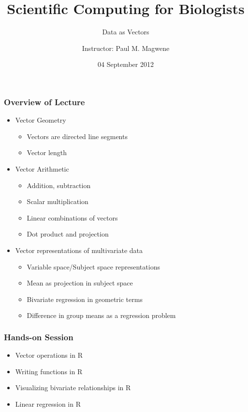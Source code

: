 \documentclass{beamer}
\title{Scientific Computing for Biologists}
\subtitle{Data as Vectors} %
\author[P. Magwene]{Instructor: Paul M. Magwene}
\date{04 September 2012}
\begin{document}
\begin{frame}
\titlepage
\end{frame}

\begin{frame}
  \frametitle{Overview of Lecture}

\begin{itemize}
		\item Vector Geometry
		\begin{itemize}
			\item Vectors are directed line segments
			\item Vector length
		\end{itemize}
		\item Vector Arithmetic
		\begin{itemize}
			\item Addition, subtraction
			\item Scalar multiplication
			\item Linear combinations of vectors
			\item Dot product and projection
		\end{itemize}
		\item Vector representations of multivariate data
		\begin{itemize}
		  \item Variable space/Subject space representations
			\item Mean as projection in subject space
			\item Bivariate regression in geometric terms
			\item Difference in group means as a regression problem
		\end{itemize}
\end{itemize}

\end{frame}

\begin{frame}
  \frametitle{Hands-on Session}
		\begin{itemize}
		  \item Vector operations in R
		  \item Writing functions in R
		  \item Visualizing bivariate relationships in R
		  \item Linear regression in R
	 \end{itemize}
\end{frame}
\end{document}
